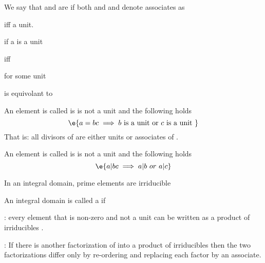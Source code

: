 \begin{Le}
\begin{D} We say that  and  are  if both  and  and denote associates as  \end{D}

\begin{R}  iff  a unit. \end{R}
\begin{R}  if a is a unit \end{R}
\begin{R}  iff  \end{R}
\begin{R}  for some unit  \end{R}

\begin{Le}  is equivolant to  \end{Le}

\begin{D} An element  is called  is  is not a unit and the following holds $$\e{a=bc \implies b \text{ is a unit or }c\text{ is a unit }}$$ 
That is: all divisors of  are either units or associates of .\end{D}

\begin{D} An element  is called  is  is not a unit and the following holds
$$\e{a|bc \implies a|b\ or \ a|c}$$
\end{D}

\begin{T} In an integral domain, prime elements are irriducible \end{T}

\begin{D} An integral domain  is called a  if 
\begin{compactitem}
\item {}: every element  that is non-zero and not a unit can be written as a product of irriducibles .
\item {}: If there is another factorization of  into a product of irriducibles then the two factorizations differ only by re-ordering and replacing each factor by an associate. 
\end{compactitem}
\end{D}


\end{Le}

